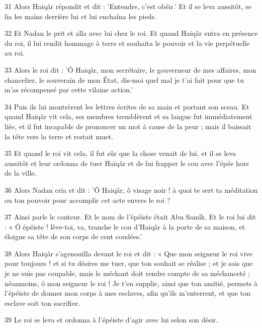 \par 31 Alors Haiqâr répondit et dit : 'Entendre, c'est obéir.' Et il se leva aussitôt, se lia les mains derrière lui et lui enchaîna les pieds.

\par 32 Et Nadan le prit et alla avec lui chez le roi. Et quand Haiqâr entra en présence du roi, il lui rendit hommage à terre et souhaita le pouvoir et la vie perpétuelle au roi.

\par 33 Alors le roi dit : 'Ô Haiqâr, mon secrétaire, le gouverneur de mes affaires, mon chancelier, le souverain de mon État, dis-moi quel mal je t'ai fait pour que tu m'as récompensé par cette vilaine action.'

\par 34 Puis ils lui montrèrent les lettres écrites de sa main et portant son sceau. Et quand Haiqâr vit cela, ses membres tremblèrent et sa langue fut immédiatement liée, et il fut incapable de prononcer un mot à cause de la peur ; mais il baissait la tête vers la terre et restait muet.

\par 35 Et quand le roi vit cela, il fut sûr que la chose venait de lui, et il se leva aussitôt et leur ordonna de tuer Haïqâr et de lui frapper le cou avec l'épée hors de la ville.

\par 36 Alors Nadan cria et dit : 'Ô Haiqâr, ô visage noir ! à quoi te sert ta méditation ou ton pouvoir pour accomplir cet acte envers le roi ?

\par 37 Ainsi parle le conteur. Et le nom de l'épéiste était Abu Samîk. Et le roi lui dit : « Ô épéiste ! lève-toi, va, tranche le cou d'Haiqâr à la porte de sa maison, et éloigne sa tête de son corps de cent coudées.'

\par 38 Alors Haiqâr s'agenouilla devant le roi et dit : « Que mon seigneur le roi vive pour toujours ! et si tu désires me tuer, que ton souhait se réalise ; et je sais que je ne suis pas coupable, mais le méchant doit rendre compte de sa méchanceté ; néanmoins, ô mon seigneur le roi ! Je t'en supplie, ainsi que ton amitié, permets à l'épéiste de donner mon corps à mes esclaves, afin qu'ils m'enterrent, et que ton esclave soit ton sacrifice.

\par 39 Le roi se leva et ordonna à l'épéiste d'agir avec lui selon son désir.


